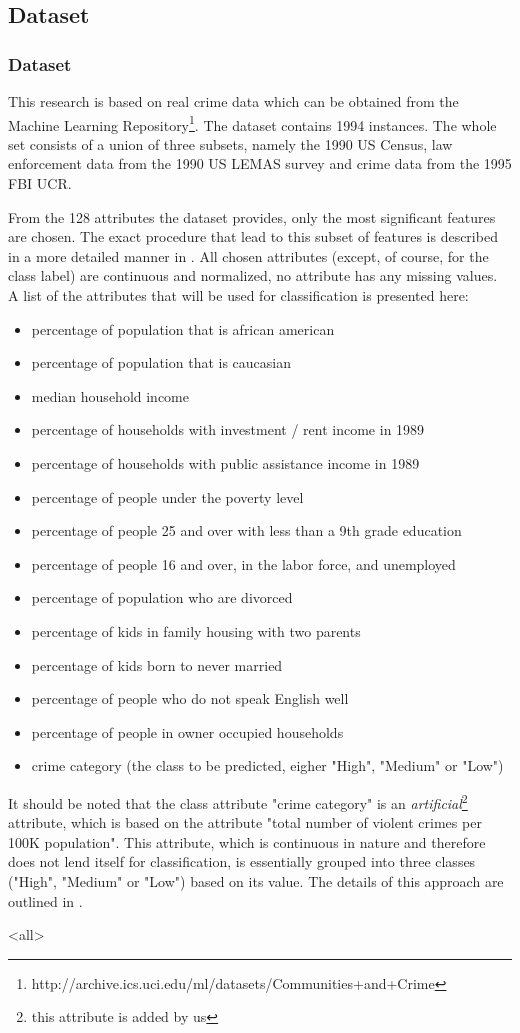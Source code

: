 \mode*

\begin{frame}
	\section{Dataset}
	\frametitle{Dataset}
\end{frame}


This research is based on real crime data which can be obtained from the Machine Learning
Repository\footnote{http://archive.ics.uci.edu/ml/datasets/Communities+and+Crime}. The
dataset contains 1994 instances. The whole set consists of a union of
three subsets, namely the 1990 US Census, law enforcement data from
the 1990 US LEMAS survey and crime data from the 1995 FBI UCR.

From the 128 attributes the dataset provides, only the most
significant features are chosen.
The exact procedure that lead to this subset of features is
described in a more detailed manner in .
All chosen attributes (except, of course, for the class label)
are continuous and normalized, no attribute has any missing
values.
A list of the attributes that will be used for classification is
presented here:
\begin{itemize}
	\setlength{\itemsep}{-2pt}
	\item percentage of population that is african american
	\item percentage of population that is caucasian
	\item median household income
	\item percentage of households with investment / rent income in 1989
	\item percentage of households with public assistance income in 1989
	\item percentage of people under the poverty level
	\item percentage of people 25 and over with less than a 9th grade education
	\item percentage of people 16 and over, in the labor force, and unemployed
	\item percentage of population who are divorced
	\item percentage of kids in family housing with two parents
	\item percentage of kids born to never married
	\item percentage of people who do not speak English well
	\item percentage of people in owner occupied households
	\item crime category (the class to be predicted, eigher "High", "Medium" or "Low")
\end{itemize}

\noindent It should be noted that the class attribute "crime category" is an \textit{artificial}\footnote{this attribute is added by us}
attribute, which is based on the attribute "total number of violent
crimes per 100K population". This attribute, which is continuous in
nature and therefore does not lend itself for classification, is
essentially grouped into three classes ("High", "Medium" or "Low")
based on its value. The details of this approach are outlined in .

\mode<all>